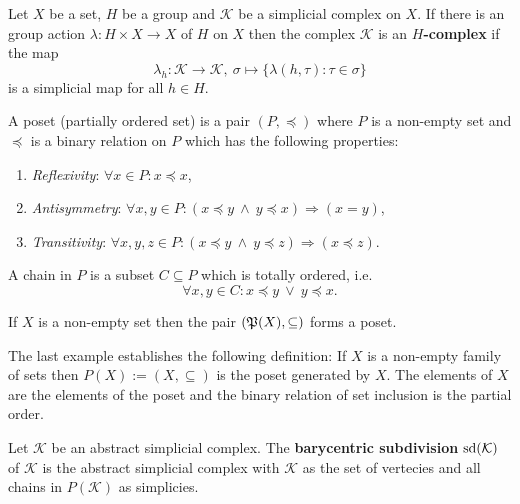 \begin{defin}
    Let $X$ be a set, $H$ be a group and $\mathcal{K}$ be a simplicial complex on $X$. If there is an 
    group action $\lambda \colon H \times X \to X$ of $H$ on $X$ then
    the complex $\mathcal{K}$ is an \textbf{$H$-complex} if the map
    \begin{equation*}
        \lambda_h \colon \mathcal{K} \to \mathcal{K}, \: \sigma \mapsto \{ \lambda(h, \tau)\colon \tau \in \sigma \}
    \end{equation*}
    is a simplicial map for all $h \in H$.
\end{defin}

\begin{defin}
    A poset (partially ordered set) is a pair $(P, \preceq)$ where 
    $P$ is a non-empty set and 
    $\preceq$ is a binary relation on $P$ which has the following properties:
    \begin{enumerate}
        \item \textit{Reflexivity}: $\forall x \in P\colon x \preceq x$,
        \item \textit{Antisymmetry}: $\forall x, y \in P\colon (x \preceq y \: \land \: y \preceq x) \Rightarrow (x = y)$,
        \item \textit{Transitivity}: $\forall x, y, z \in P\colon (x \preceq y \: \land \: y \preceq z) \Rightarrow (x \preceq z)$.
    \end{enumerate}
    A chain in $P$ is a subset $C \subseteq P$ which is totally ordered, i.e.
    \begin{equation*}
        \forall x, y \in C\colon x \preceq y \: \lor \: y \preceq x.
    \end{equation*}
\end{defin}

\begin{ex}
    If $X$ is a non-empty set then the pair $(\mathfrak{P}(X), \subseteq)$ forms a poset.
\end{ex}

The last example establishes the following definition:
If $X$ is a non-empty family of sets then $P(X) := (X, \subseteq)$ is the poset generated by $X$. The elements of $X$
are the elements of the poset and the binary relation of set inclusion is the partial order.

\begin{defin}
    Let $\mathcal{K}$ be an abstract simplicial complex. The \textbf{barycentric subdivision} ${\rm sd}(\mathcal{K})$ of $\mathcal{K}$
    is the abstract simplicial complex with $\mathcal{K}$ as the set of vertecies and all chains in $P(\mathcal{K})$ as simplicies.
\end{defin}

